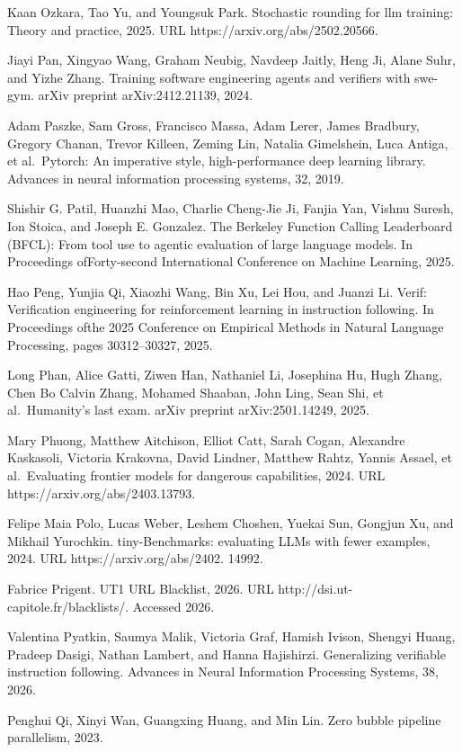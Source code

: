 \documentclass[
  10
]{article}
\begin{document}
Kaan Ozkara, Tao Yu, and Youngsuk Park. Stochastic rounding for llm
training: Theory and practice, 2025. URL
https://arxiv.org/abs/2502.20566.

Jiayi Pan, Xingyao Wang, Graham Neubig, Navdeep Jaitly, Heng Ji, Alane
Suhr, and Yizhe Zhang. Training software engineering agents and
verifiers with swe-gym. arXiv preprint arXiv:2412.21139, 2024.

Adam Paszke, Sam Gross, Francisco Massa, Adam Lerer, James Bradbury,
Gregory Chanan, Trevor Killeen, Zeming Lin, Natalia Gimelshein, Luca
Antiga, et al.~Pytorch: An imperative style, high-performance deep
learning library. Advances in neural information processing systems, 32,
2019.

Shishir G. Patil, Huanzhi Mao, Charlie Cheng-Jie Ji, Fanjia Yan, Vishnu
Suresh, Ion Stoica, and Joseph E. Gonzalez. The Berkeley Function
Calling Leaderboard (BFCL): From tool use to agentic evaluation of large
language models. In Proceedings ofForty-second International Conference
on Machine Learning, 2025.

Hao Peng, Yunjia Qi, Xiaozhi Wang, Bin Xu, Lei Hou, and Juanzi Li.
Verif: Verification engineering for reinforcement learning in
instruction following. In Proceedings ofthe 2025 Conference on Empirical
Methods in Natural Language Processing, pages 30312--30327, 2025.

Long Phan, Alice Gatti, Ziwen Han, Nathaniel Li, Josephina Hu, Hugh
Zhang, Chen Bo Calvin Zhang, Mohamed Shaaban, John Ling, Sean Shi, et
al.~Humanity's last exam. arXiv preprint arXiv:2501.14249, 2025.

Mary Phuong, Matthew Aitchison, Elliot Catt, Sarah Cogan, Alexandre
Kaskasoli, Victoria Krakovna, David Lindner, Matthew Rahtz, Yannis
Assael, et al.~Evaluating frontier models for dangerous capabilities,
2024. URL https://arxiv.org/abs/2403.13793.

Felipe Maia Polo, Lucas Weber, Leshem Choshen, Yuekai Sun, Gongjun Xu,
and Mikhail Yurochkin. tiny-Benchmarks: evaluating LLMs with fewer
examples, 2024. URL https://arxiv.org/abs/2402. 14992.

Fabrice Prigent. UT1 URL Blacklist, 2026. URL
http://dsi.ut-capitole.fr/blacklists/. Accessed 2026.

Valentina Pyatkin, Saumya Malik, Victoria Graf, Hamish Ivison, Shengyi
Huang, Pradeep Dasigi, Nathan Lambert, and Hanna Hajishirzi.
Generalizing verifiable instruction following. Advances in Neural
Information Processing Systems, 38, 2026.

Penghui Qi, Xinyi Wan, Guangxing Huang, and Min Lin. Zero bubble
pipeline parallelism, 2023.
\end{document}
